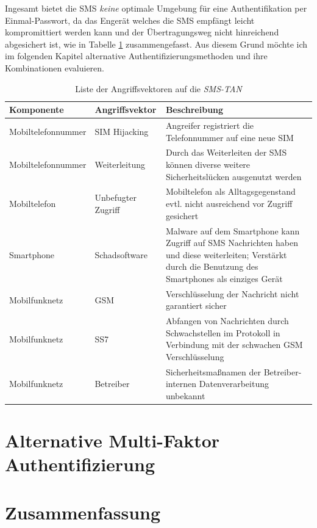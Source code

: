 \documentclass[11pt,a4paper,ngerman]{scrreprt}
\begin{document}
Ingesamt bietet die SMS \emph{keine} optimale Umgebung für eine Authentifikation per Einmal-Passwort, da das Engerät welches die SMS empfängt leicht kompromittiert werden kann und der Übertragungsweg nicht hinreichend abgesichert ist, wie in Tabelle \ref{table:AngriffsvektorenSMSTAN} zusammengefasst. Aus diesem Grund möchte ich im folgenden Kapitel alternative Authentifizierungsmethoden und ihre Kombinationen evaluieren.
\begin{table}[htbp]
    \begin{tabularx}{\textwidth}{ llX }
        \toprule
        Komponente & Angriffsvektor & Beschreibung  \\
        \midrule
        Mobiltelefonnummer & SIM Hijacking & Angreifer registriert die Telefonnummer auf eine neue SIM \\
        Mobiltelefonnummer & Weiterleitung & Durch das Weiterleiten der SMS können diverse weitere Sicherheitslücken ausgenutzt werden \\
        Mobiltelefon & Unbefugter Zugriff & Mobiltelefon als Alltagsgegenstand evtl. nicht ausreichend vor Zugriff gesichert \\
        Smartphone & Schadsoftware & Malware auf dem Smartphone kann Zugriff auf SMS Nachrichten haben und diese weiterleiten; Verstärkt durch die Benutzung des Smartphones als einziges Gerät \\
        Mobilfunknetz & GSM & Verschlüsselung der Nachricht nicht garantiert sicher \\
        Mobilfunknetz & SS7 & Abfangen von Nachrichten durch Schwachstellen im Protokoll in Verbindung mit der schwachen GSM Verschlüsselung \\
        Mobilfunknetz & Betreiber & Sicherheitsmaßnamen der Betreiber-internen Datenverarbeitung unbekannt \\
    \end{tabularx}
    \caption{Liste der Angriffsvektoren auf die \textit{SMS-TAN}}
    \label{table:AngriffsvektorenSMSTAN}
\end{table}

\chapter{Alternative Multi-Faktor Authentifizierung}


\chapter{Zusammenfassung}


\end{document}
